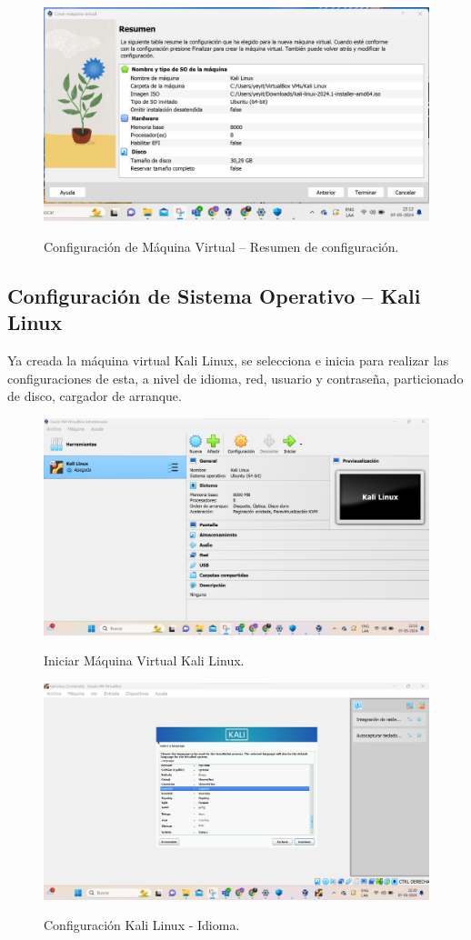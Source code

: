 \documentclass[stu, 11pt, letterpaper, donotrepeattitle, floatsintext, natbib]{apa7}
\begin{document}
\begin{figure}[H]
    \centering
    \caption{Configuración de Máquina Virtual – Resumen de configuración.}
    \includegraphics[width=0.5\linewidth]{imagenCap2/16.png} %
    \label{fig:OverallEffect}
\end{figure}

\subsection{Configuración de Sistema Operativo – Kali Linux}

Ya creada la máquina virtual Kali Linux, se selecciona e inicia para realizar las configuraciones de esta, a nivel de idioma, red, usuario y contraseña, particionado de disco, cargador de arranque.

\begin{figure}[H]
    \centering
    \caption{Iniciar Máquina Virtual Kali Linux.}
    \includegraphics[width=0.5\linewidth]{imagenCap2/17.png} %
    \label{fig:OverallEffect}
\end{figure}

\begin{figure}[H]
    \centering
    \caption{Configuración Kali Linux - Idioma.}
    \includegraphics[width=0.5\linewidth]{imagenCap2/18.png} %
    \label{fig:OverallEffect}
\end{figure}
\end{document}
